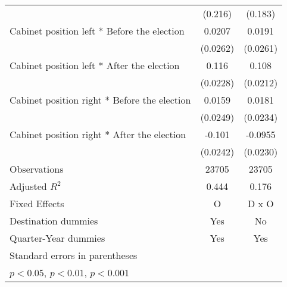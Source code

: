 \begin{table}[htbp]
\begin{tabular}{l*{2}{c}}
                    &     (0.216)         &     (0.183)         \\
[1em]
Cabinet position left * Before the election&      0.0207         &      0.0191         \\
                    &    (0.0262)         &    (0.0261)         \\
[1em]
Cabinet position left * After the election&       0.116\sym{***}&       0.108\sym{***}\\
                    &    (0.0228)         &    (0.0212)         \\
[1em]
Cabinet position right * Before the election&      0.0159         &      0.0181         \\
                    &    (0.0249)         &    (0.0234)         \\
[1em]
Cabinet position right * After the election&      -0.101\sym{***}&     -0.0955\sym{***}\\
                    &    (0.0242)         &    (0.0230)         \\
\hline
Observations        &       23705         &       23705         \\
Adjusted \(R^{2}\)  &       0.444         &       0.176         \\
Fixed Effects       &           O         &       D x O         \\
Destination dummies &         Yes         &          No         \\
Quarter-Year dummies&         Yes         &         Yes         \\
\hline\hline
\multicolumn{3}{l}{\footnotesize Standard errors in parentheses}\\
\multicolumn{3}{l}{\footnotesize \sym{*} \(p<0.05\), \sym{**} \(p<0.01\), \sym{***} \(p<0.001\)}\\
\end{tabular}
\end{table}
